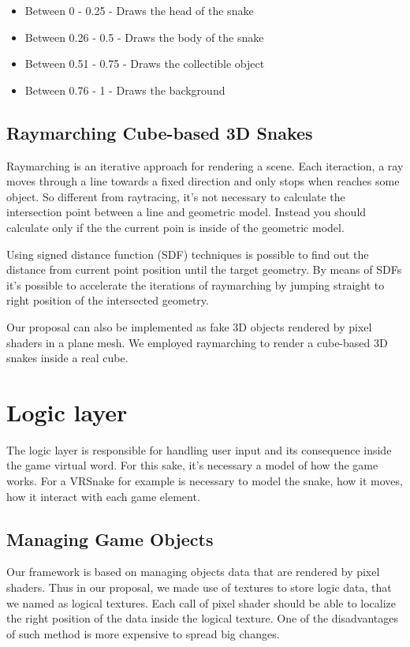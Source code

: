 \documentclass[runningheads]{llncs}
\begin{document}
\begin{itemize}
  \item Between 0 - 0.25 - Draws the head of the snake
  \item Between 0.26 - 0.5 - Draws the body of the snake
  \item Between 0.51 - 0.75 - Draws the collectible object
  \item Between 0.76 - 1 - Draws the background
\end{itemize}

\subsection{Raymarching Cube-based 3D Snakes}
\label{subsec:raymarching-snakes}
Raymarching is an iterative approach for rendering a scene. Each iteraction, a ray moves through a line towards a fixed direction and only stops when reaches some object. So different from raytracing, it's not necessary to calculate the intersection point between a line and geometric model. Instead you should calculate only if the the current poin is inside of the geometric model.

Using signed distance function (SDF) techniques \cite{hart1996sphere} is possible to find out the distance from current point position until the target geometry. By means of SDFs it's possible to accelerate the iterations of raymarching by jumping straight to right position of the intersected geometry.

Our proposal can also be implemented as fake 3D objects rendered by pixel shaders in a plane mesh. We employed raymarching to render a cube-based 3D snakes inside a real cube.

\section{Logic layer}

The logic layer is responsible for handling user input and its consequence inside the game virtual word. For this sake, it's necessary a model of how the game works. For a VRSnake for example is necessary to model the snake, how it moves, how it interact with each game element.

\subsection{Managing Game Objects}

Our framework is based on managing objects data that are rendered by pixel shaders. Thus in our proposal, we made use of textures to store logic data, that we named as logical textures. Each call of pixel shader should be able to localize the right position of the data inside the logical texture. One of the disadvantages of such method is more expensive to spread big changes.
\end{document}
